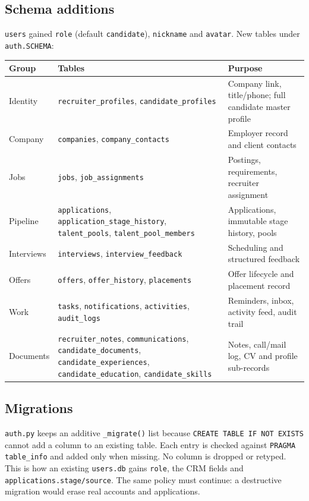 \documentclass[11pt,a4paper]{article}
\newcommand{\file}[1]{\texttt{\small #1}}
\newcommand{\code}[1]{\texttt{#1}}
\begin{document}
\subsection{Schema additions}
\code{users} gained \code{role} (default \code{candidate}),
\code{nickname} and \code{avatar}. New tables under \file{auth.SCHEMA}:
\begin{center}
\begin{tabular}{@{}llp{8.5cm}@{}}
\toprule
\textbf{Group} & \textbf{Tables} & \textbf{Purpose}\\
\midrule
Identity & \code{recruiter\_profiles}, \code{candidate\_profiles} &
  Company link, title/phone; full candidate master profile\\
Company & \code{companies}, \code{company\_contacts} &
  Employer record and client contacts\\
Jobs & \code{jobs}, \code{job\_assignments} &
  Postings, requirements, recruiter assignment\\
Pipeline & \code{applications}, \code{application\_stage\_history},
  \code{talent\_pools}, \code{talent\_pool\_members} &
  Applications, immutable stage history, pools\\
Interviews & \code{interviews}, \code{interview\_feedback} &
  Scheduling and structured feedback\\
Offers & \code{offers}, \code{offer\_history}, \code{placements} &
  Offer lifecycle and placement record\\
Work & \code{tasks}, \code{notifications}, \code{activities},
  \code{audit\_logs} & Reminders, inbox, activity feed, audit trail\\
Documents & \code{recruiter\_notes}, \code{communications},
  \code{candidate\_documents}, \code{candidate\_experiences},
  \code{candidate\_education}, \code{candidate\_skills} &
  Notes, call/mail log, CV and profile sub-records\\
\bottomrule
\end{tabular}
\end{center}

\subsection{Migrations}
\file{auth.py} keeps an additive \code{\_migrate()} list because
\code{CREATE TABLE IF NOT EXISTS} cannot add a column to an existing table.
Each entry is checked against \code{PRAGMA table\_info} and added only when
missing. No column is dropped or retyped. This is how an existing
\code{users.db} gains \code{role}, the CRM fields and
\code{applications.stage/source}. The same policy must continue: a destructive
migration would erase real accounts and applications.
\end{document}
